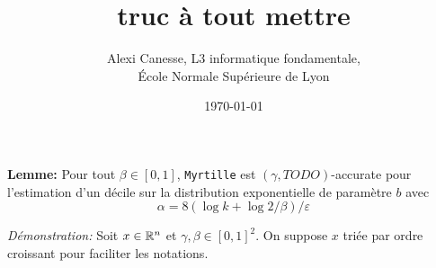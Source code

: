 
\usepackage{tkz-base}
\usepackage{algorithm}
\usepackage{algorithmic}
\setlength\parindent{0pt}





\title{truc à tout mettre}           
\author{Alexi Canesse, L3 informatique fondamentale,\\École Normale Supérieure de Lyon}
\date{\today}          

\sloppy                  

\pgfplotsset{compat=1.16}







\textbf{Lemme: } Pour tout \(\beta \in [0,1]\), \texttt{Myrtille} est \((\gamma, TODO)\)-accurate pour l'estimation d'un décile sur la distribution exponentielle de paramètre \(b\) avec
\[\alpha = 8\left( \log k + \log 2/\beta \right)/\varepsilon\]

\textit{Démonstration:} Soit \(x \in \mathbb{R}^n\) et \(\gamma, \beta \in [0,1]^2\). On suppose \(x\) triée par ordre croissant pour faciliter les notations.\\

